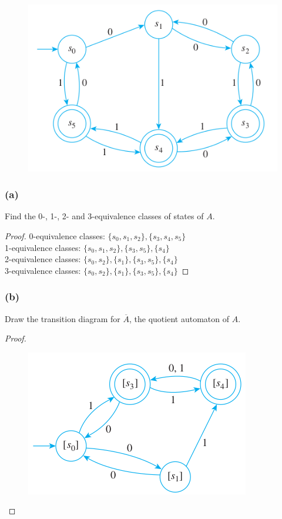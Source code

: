\documentclass[14pt]{extarticle}
\begin{document}
\begin{figure}[ht!]
\centering
\includegraphics[scale=0.5]{../images/12.3.4.png}
\end{figure}

\subsubsection{(a)}
Find the 0-, 1-, 2- and 3-equivalence classes of states of \(A\).

\begin{proof}
0-equivalence classes: \(\{s_0, s_1, s_2\}, \{s_3, s_4, s_5\}\) \\
1-equivalence classes: \(\{s_0, s_1, s_2\}, \{s_3, s_5\}, \{s_4\}\) \\
2-equivalence classes: \(\{s_0, s_2\}, \{s_1\}, \{s_3, s_5\}, \{s_4\}\) \\
3-equivalence classes: \(\{s_0, s_2\}, \{s_1\}, \{s_3, s_5\}, \{s_4\}\)
\end{proof}

\subsubsection{(b)}
Draw the transition diagram for \(\overline{A}\), the quotient automaton of \(A\).

\begin{proof}
\begin{figure}[ht!]
\centering
\includegraphics[scale=0.5]{../images/12.3.4.b.png}
\end{figure}
\end{proof}
\end{document}
